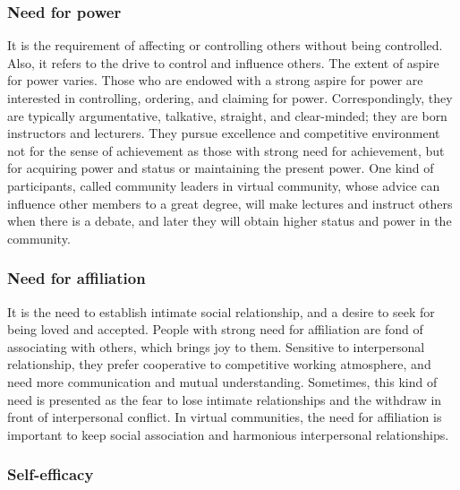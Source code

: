 \documentclass[doublespacing]{elsarticle}
\begin{document}
\subsubsection{ Need for power}
\label{sec:need-power}

It is the requirement of affecting or controlling
others without being controlled. Also, it refers to the drive to
control and influence others. The extent of aspire for power
varies. Those who are endowed with a strong aspire for power are
interested in controlling, ordering, and claiming for
power. Correspondingly, they are typically argumentative, talkative,
straight, and clear-minded; they are born instructors and
lecturers. They pursue excellence and competitive environment not for
the sense of achievement as those with strong need for achievement,
but for acquiring power and status or maintaining the present
power. One kind of participants, called community leaders in virtual
community, whose advice can influence other members to a great degree,
will make lectures and instruct others when there is a debate, and
later they will obtain higher status and power in the community. 

\subsubsection{ Need for affiliation}
\label{sec:need-affiliation}

It is the need to establish intimate social
relationship, and a desire to seek for being loved and
accepted. People with strong need for affiliation are fond of
associating with others, which brings joy to them. Sensitive to
interpersonal relationship, they prefer cooperative to competitive
working atmosphere, and need more communication and mutual
understanding. Sometimes, this kind of need is presented as the fear
to lose intimate relationships and the withdraw in front of
interpersonal conflict. In virtual communities, the need for
affiliation is important to keep social association and harmonious
interpersonal relationships.

\subsubsection{Self-efficacy}
\label{sec:self-efficacy}
\end{document}
